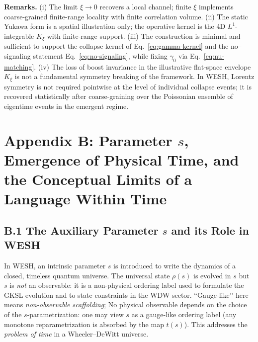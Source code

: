 \documentclass[12pt,a4paper]{article}
\numberwithin{equation}{section}
\begin{document}
\vspace{0.6cm}
\noindent\textbf{Remarks.}
(i) The limit \(\xi\to 0\) recovers a local channel; finite \(\xi\) implements coarse-grained finite-range locality with finite correlation volume.  
(ii) The static Yukawa form is a spatial illustration only; the operative kernel is the 4D $L^1$-integrable \(K_\xi\) with finite-range support.  
(iii) The construction is minimal and sufficient to support the collapse kernel of Eq.~\eqref{eq:gamma-kernel} and the no–signaling statement Eq.~\eqref{eq:no-signaling}, while fixing \(\gamma_0\) via Eq.~\eqref{eq:nu-matching}.   
(iv) The loss of boost invariance in the illustrative flat-space envelope \(K_\xi\) is not a fundamental symmetry breaking of the framework. In WESH, Lorentz symmetry is not required pointwise at the level of individual collapse events; it is recovered statistically after coarse-graining over the Poissonian ensemble of eigentime events in the emergent regime.
\endgroup

\vspace{1cm}

\section*{Appendix B: Parameter \(s\), Emergence of Physical Time, and the Conceptual Limits of a Language Within Time}

\subsection*{B.1 The Auxiliary Parameter $s$ and its Role in WESH}
\vspace{0.5cm}
\begingroup
\setcounter{equation}{0}
\renewcommand{\theequation}{B.\arabic{equation}}
\renewcommand{\theHequation}{B.\arabic{equation}}

In WESH, an intrinsic parameter $s$ is introduced to write the dynamics of a closed, timeless quantum universe. The universal state $\rho(s)$ is evolved in $s$ but $s$ is \emph{not} an observable: it is a non-physical ordering label used to formulate the GKSL evolution and to state constraints in the WDW sector. “Gauge-like’’ here means \emph{non-observable scaffolding}; No physical observable depends on the choice of the $s$-parametrization: one may view $s$ as a gauge-like ordering label (any monotone reparametrization is absorbed by the map $t(s)$). This addresses the \emph{problem of time} in a Wheeler--DeWitt universe.
\end{document}
